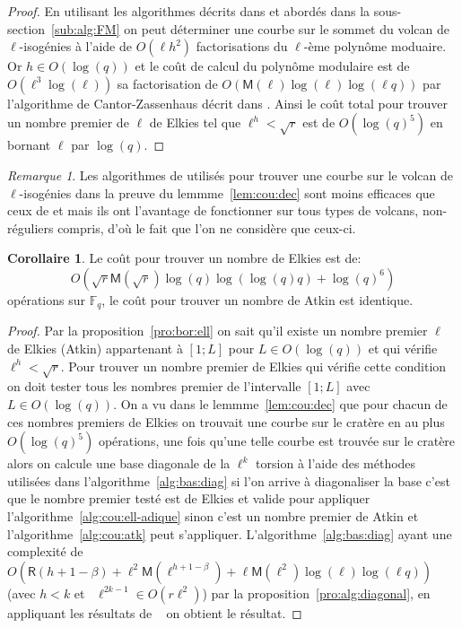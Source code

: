 \documentclass[10pt,a4paper]{book}
\theoremstyle{plain}
\theoremstyle{definition}
\theoremstyle{definition}
\newtheorem{cor}[thm]{Corollaire}
\theoremstyle{definition}
\theoremstyle{definition}
\theoremstyle{remark}
\newtheorem{rem}[thm]{Remarque}
\theoremstyle{remark}
\theoremstyle{definition}
\begin{document}
\begin{proof}
En utilisant les algorithmes décrits dans \cite{FouquetMorain02} et abordés 
dans la sous-section~\ref{sub:alg:FM} on peut déterminer une courbe sur le 
sommet du volcan de $\ell$-isogénies à l'aide de $O(\ell h^2)$ 
  factorisations du $\ell$-ème polynôme moduaire. Or $h \in O(\log(q))$ et
  le coût de calcul du polynôme modulaire est de $O(\ell^3\log(\ell))$ sa factorisation de 
  $O(\mathsf{M}(\ell)\log(\ell)\log(\ell q))$ par l'algorithme de 
  Cantor-Zassenhaus décrit dans \cite[Chapter~14.5]{vzGJG03}. Ainsi le coût 
  total pour trouver un nombre premier de $\ell$ de Elkies tel que $\ell^h<\sqrt{r}$  est de
  $O(\log(q)^5)$ en bornant $\ell$ par $\log(q)$.
\end{proof}

\begin{rem}
Les algorithmes de \cite{FouquetMorain02} utilisés pour trouver une courbe sur 
le volcan de $\ell$-isogénies  dans la preuve du 
lemmme~\ref{lem:cou:dec} sont moins efficaces que ceux de 
\cite{Ionica-Joux10} et \cite{MiretMRV05} mais ils ont l'avantage de 
fonctionner sur tous types de volcans, non-réguliers compris, d'où le fait que
l'on ne considère que ceux-ci.
\end{rem}

\begin{cor}
\label{cor:atk:elk:dist}
Le coût pour trouver un nombre de Elkies est de:
\[O(\sqrt{r}\mathsf{M}(\sqrt{r})\log(q)\log(\log(q) q)+\log(q)^6)\]
opérations sur $\mathbb{F}_q$, le coût pour trouver un nombre de Atkin est 
identique.
\end{cor}

\begin{proof}
Par la proposition~\ref{pro:bor:ell} on sait qu'il existe un nombre premier 
$\ell$ de Elkies (Atkin) appartenant à $[1;L]$ pour $L \in O(\log(q))$ et qui 
vérifie $\ell^{h} < \sqrt{r}$. Pour trouver un nombre premier de Elkies qui 
vérifie cette condition on doit tester tous les nombres premier de l'intervalle
$[1;L]$ avec $L \in O(\log(q))$. On a vu dans le lemmme~\ref{lem:cou:dec} 
que pour chacun de ces nombres premiers de Elkies on trouvait une courbe sur le
cratère en au plus $O(\log(q)^5)$ opérations, une fois qu'une telle courbe est 
trouvée sur le cratère alors on calcule une base diagonale de la $\ell^k$ 
torsion à l'aide des méthodes utilisées dans l'algorithme~\ref{alg:bas:diag} si
l'on arrive à diagonaliser la base c'est que le nombre premier testé est de 
Elkies et valide pour appliquer l'algorithme~\ref{alg:cou:ell-adique} sinon 
c'est un nombre premier de Atkin et l'algorithme~\ref{alg:cou:atk} peut 
s'appliquer. L'algorithme~\ref{alg:bas:diag} ayant une complexité de 
$O(\mathsf{R}(h+1-\beta)+\ell^2\mathsf{M}(\ell^{h+1-\beta})+\ell 
\mathsf{M}(\ell^2)\log(\ell)\log(\ell q))$ (avec $h<k$ et ~$\ell^{2k-1} \in O(r\ell^2)$)
par la proposition~\ref{pro:alg:diagonal}, en appliquant les résultats de 
~\cite[Chapter~14.5]{vzGJG03} on obtient le résultat.
\end{proof}
\end{document}
